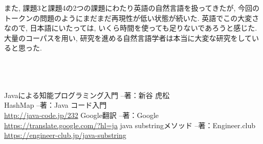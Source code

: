 \documentclass[uplatex,12pt]{jsarticle}
\begin{document}
また, 課題3と課題4の2つの課題にわたり英語の自然言語を扱ってきたが, 今回のトークンの問題のようにまだまだ再現性が低い状態が続いた. 英語でこの大変さなので, 日本語にいたっては, いくら時間を使っても足りないであろうと感じた. 大量のコーパスを用い, 研究を進める自然言語学者は本当に大変な研究をしていると思った.\\\\\\\\

\begin{thebibliography}{99}
 Javaによる知能プログラミング入門 --著：新谷 虎松 \\
 HashMap --著：Java コード入門 \\
\url{http://java-code.jp/232}
 Google翻訳 --著：Google \\
\url{https://translate.google.com/?hl=ja}
 java substringメソッド --著：Engineer.club \\
\url{https://engineer-club.jp/java-substring}
\end{thebibliography}
\end{document}
